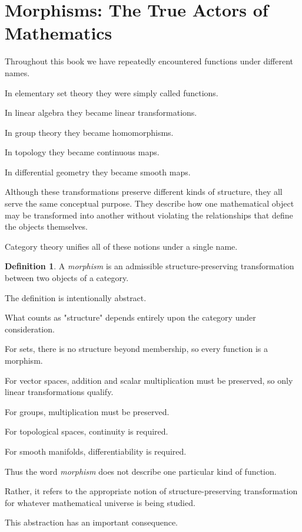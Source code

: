 \documentclass[11pt]{book}
\numberwithin{equation}{chapter}
\theoremstyle{definition}
\newtheorem{definition}{Definition}[chapter]
\theoremstyle{plain}
\theoremstyle{remark}
\begin{document}
\section{Morphisms: The True Actors of Mathematics}

Throughout this book we have repeatedly encountered functions under different names.

In elementary set theory they were simply called functions.

In linear algebra they became linear transformations.

In group theory they became homomorphisms.

In topology they became continuous maps.

In differential geometry they became smooth maps.

Although these transformations preserve different kinds of structure, they all serve the same conceptual purpose. They describe how one mathematical object may be transformed into another without violating the relationships that define the objects themselves.

Category theory unifies all of these notions under a single name.

\begin{definition}
A \emph{morphism} is an admissible structure-preserving transformation between two objects of a category.
\end{definition}

The definition is intentionally abstract.

What counts as "structure" depends entirely upon the category under consideration.

For sets, there is no structure beyond membership, so every function is a morphism.

For vector spaces, addition and scalar multiplication must be preserved, so only linear transformations qualify.

For groups, multiplication must be preserved.

For topological spaces, continuity is required.

For smooth manifolds, differentiability is required.

Thus the word \emph{morphism} does not describe one particular kind of function.

Rather, it refers to the appropriate notion of structure-preserving transformation for whatever mathematical universe is being studied.

This abstraction has an important consequence.
\end{document}
